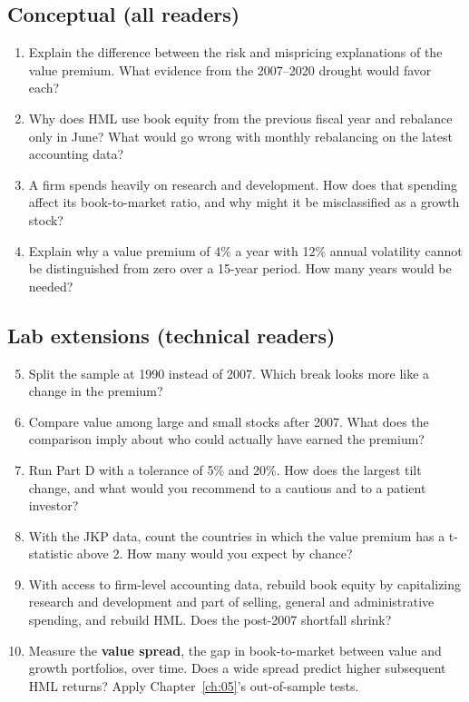 \subsection*{Conceptual (all readers)}

\begin{enumerate}
  \item Explain the difference between the risk and mispricing explanations of the value premium. What evidence from the 2007--2020 drought would favor each?
  \item Why does HML use book equity from the previous fiscal year and rebalance only in June? What would go wrong with monthly rebalancing on the latest accounting data?
  \item A firm spends heavily on research and development. How does that spending affect its book-to-market ratio, and why might it be misclassified as a growth stock?
  \item Explain why a value premium of 4\% a year with 12\% annual volatility cannot be distinguished from zero over a 15-year period. How many years would be needed?
\end{enumerate}

\subsection*{Lab extensions (technical readers)}

\begin{enumerate}
  \setcounter{enumi}{4}
  \item Split the sample at 1990 instead of 2007. Which break looks more like a change in the premium?
  \item Compare value among large and small stocks after 2007. What does the comparison imply about who could actually have earned the premium?
  \item Run Part D with a tolerance of 5\% and 20\%. How does the largest tilt change, and what would you recommend to a cautious and to a patient investor?
  \item With the JKP data, count the countries in which the value premium has a t-statistic above 2. How many would you expect by chance?
  \item With access to firm-level accounting data, rebuild book equity by capitalizing research and development and part of selling, general and administrative spending, and rebuild HML. Does the post-2007 shortfall shrink?
  \item Measure the \textbf{value spread}, the gap in book-to-market between value and growth portfolios, over time. Does a wide spread predict higher subsequent HML returns? Apply Chapter~\ref{ch:05}'s out-of-sample tests.
\end{enumerate}
